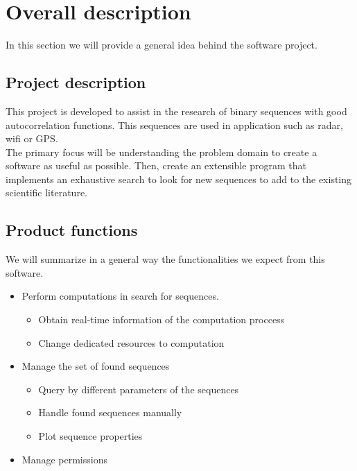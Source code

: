 \section{Overall description}

  In this section we will provide a general idea behind the software project.
  \subsection{Project description}

  This project is developed to assist in the research of binary sequences with
  good autocorrelation functions. This sequences are used in application such
  as radar, wifi or GPS.\\

  The primary focus will be understanding the problem domain to create a
  software as useful as possible. Then, create an extensible program that
  implements an exhaustive search to look for new sequences to add to the
  existing scientific literature.\\

  \subsection{Product functions}

  We will summarize in a general way the functionalities we expect from
  this software.

  \begin{itemize}
    \item Perform computations in search for sequences.\\
            \begin{itemize}
              \item Obtain real-time information of the computation proccess
              \item Change dedicated resources to computation
            \end{itemize}
    \item Manage the set of found sequences
            \begin{itemize}
              \item Query by different parameters of the sequences
              \item Handle found sequences manually
              \item Plot sequence properties
            \end{itemize}
    \item Manage permissions
  \end{itemize}

